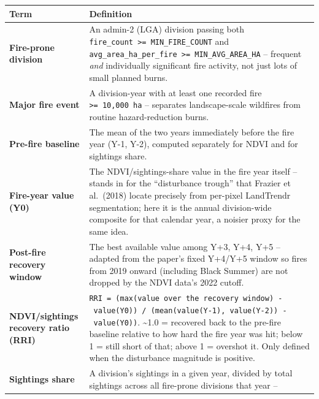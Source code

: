 \documentclass[
  letterpaper,
  DIV=11,
  numbers=noendperiod]{scrartcl}
\begin{document}
\begin{longtable}[]{@{}
  >{\raggedright\arraybackslash}p{}
  >{\raggedright\arraybackslash}p{}@{}}
\toprule\noalign{}
\begin{minipage}[b]{\linewidth}\raggedright
Term
\end{minipage} & \begin{minipage}[b]{\linewidth}\raggedright
Definition
\end{minipage} \\
\midrule\noalign{}
\endhead
\bottomrule\noalign{}
\endlastfoot
\textbf{Fire-prone division} & An admin-2 (LGA) division passing both
\texttt{fire\_count\ \textgreater{}=\ MIN\_FIRE\_COUNT} and
\texttt{avg\_area\_ha\_per\_fire\ \textgreater{}=\ MIN\_AVG\_AREA\_HA}
-- frequent \emph{and} individually significant fire activity, not just
lots of small planned burns. \\
\textbf{Major fire event} & A division-year with at least one recorded
fire \texttt{\textgreater{}=\ 10,000\ ha} -- separates landscape-scale
wildfires from routine hazard-reduction burns. \\
\textbf{Pre-fire baseline} & The mean of the two years immediately
before the fire year (Y-1, Y-2), computed separately for NDVI and for
sightings share. \\
\textbf{Fire-year value (Y0)} & The NDVI/sightings-share value in the
fire year itself -- stands in for the ``disturbance trough'' that
Frazier et al.~(2018) locate precisely from per-pixel LandTrendr
segmentation; here it is the annual division-wide composite for that
calendar year, a noisier proxy for the same idea. \\
\textbf{Post-fire recovery window} & The best available value among Y+3,
Y+4, Y+5 -- adapted from the paper's fixed Y+4/Y+5 window so fires from
2019 onward (including Black Summer) are not dropped by the NDVI data's
2022 cutoff. \\
\textbf{NDVI/sightings recovery ratio (RRI)} &
\texttt{RRI\ =\ (max(value\ over\ the\ recovery\ window)\ -\ value(Y0))\ /\ (mean(value(Y-1),\ value(Y-2))\ -\ value(Y0))}.
\textasciitilde1.0 = recovered back to the pre-fire baseline relative to
how hard the fire year was hit; below 1 = still short of that; above 1 =
overshot it. Only defined when the disturbance magnitude is positive. \\
\textbf{Sightings share} & A division's sightings in a given year,
divided by total sightings across all fire-prone divisions that year --

\end{longtable}
\end{document}
